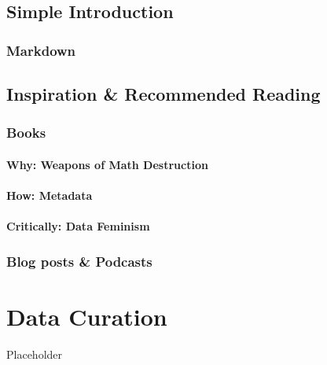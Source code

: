 \documentclass[
  fontsize=13pt,
  english,
  a4paper,
  openany, a4paper, oneside]{book}
\begin{document}
\hypertarget{simple-intro}{%
\section{Simple Introduction}\label{simple-intro}}

\hypertarget{markdown}{%
\subsection{Markdown}\label{markdown}}

\hypertarget{inspiration}{%
\section{Inspiration \& Recommended Reading}\label{inspiration}}

\hypertarget{books}{%
\subsection{Books}\label{books}}

\hypertarget{why-weapons-of-math-destruction}{%
\subsubsection{Why: Weapons of Math Destruction}\label{why-weapons-of-math-destruction}}

\hypertarget{how-metadata}{%
\subsubsection{How: Metadata}\label{how-metadata}}

\hypertarget{critically-data-feminism}{%
\subsubsection{Critically: Data Feminism}\label{critically-data-feminism}}

\hypertarget{blogposts}{%
\subsection{Blog posts \& Podcasts}\label{blogposts}}

\hypertarget{data-curation}{%
\chapter{Data Curation}\label{data-curation}}

Placeholder
\end{document}
